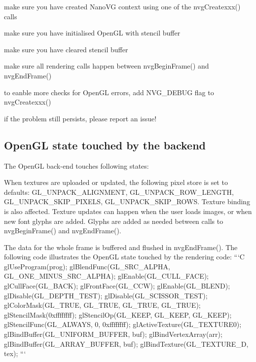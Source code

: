 \begin{DoxyItemize}
\item make sure you have created Nano\+V\+G context using one of the {\ttfamily nvg\+Createxxx()} calls
\item make sure you have initialised Open\+G\+L with stencil buffer
\item make sure you have cleared stencil buffer
\item make sure all rendering calls happen between {\ttfamily nvg\+Begin\+Frame()} and {\ttfamily nvg\+End\+Frame()}
\item to eanble more checks for Open\+G\+L errors, add {\ttfamily N\+V\+G\+\_\+\+D\+E\+B\+U\+G} flag to {\ttfamily nvg\+Createxxx()}
\item if the problem still persists, please report an issue!
\end{DoxyItemize}

\subsection*{Open\+G\+L state touched by the backend}

The Open\+G\+L back-\/end touches following states\+:

When textures are uploaded or updated, the following pixel store is set to defaults\+: {\ttfamily G\+L\+\_\+\+U\+N\+P\+A\+C\+K\+\_\+\+A\+L\+I\+G\+N\+M\+E\+N\+T}, {\ttfamily G\+L\+\_\+\+U\+N\+P\+A\+C\+K\+\_\+\+R\+O\+W\+\_\+\+L\+E\+N\+G\+T\+H}, {\ttfamily G\+L\+\_\+\+U\+N\+P\+A\+C\+K\+\_\+\+S\+K\+I\+P\+\_\+\+P\+I\+X\+E\+L\+S}, {\ttfamily G\+L\+\_\+\+U\+N\+P\+A\+C\+K\+\_\+\+S\+K\+I\+P\+\_\+\+R\+O\+W\+S}. Texture binding is also affected. Texture updates can happen when the user loads images, or when new font glyphs are added. Glyphs are added as needed between calls to {\ttfamily nvg\+Begin\+Frame()} and {\ttfamily nvg\+End\+Frame()}.

The data for the whole frame is buffered and flushed in {\ttfamily nvg\+End\+Frame()}. The following code illustrates the Open\+G\+L state touched by the rendering code\+: ```\+C gl\+Use\+Program(prog); gl\+Blend\+Func(\+G\+L\+\_\+\+S\+R\+C\+\_\+\+A\+L\+P\+H\+A, G\+L\+\_\+\+O\+N\+E\+\_\+\+M\+I\+N\+U\+S\+\_\+\+S\+R\+C\+\_\+\+A\+L\+P\+H\+A); gl\+Enable(\+G\+L\+\_\+\+C\+U\+L\+L\+\_\+\+F\+A\+C\+E); gl\+Cull\+Face(\+G\+L\+\_\+\+B\+A\+C\+K); gl\+Front\+Face(\+G\+L\+\_\+\+C\+C\+W); gl\+Enable(\+G\+L\+\_\+\+B\+L\+E\+N\+D); gl\+Disable(\+G\+L\+\_\+\+D\+E\+P\+T\+H\+\_\+\+T\+E\+S\+T); gl\+Disable(\+G\+L\+\_\+\+S\+C\+I\+S\+S\+O\+R\+\_\+\+T\+E\+S\+T); gl\+Color\+Mask(\+G\+L\+\_\+\+T\+R\+U\+E, G\+L\+\_\+\+T\+R\+U\+E, G\+L\+\_\+\+T\+R\+U\+E, G\+L\+\_\+\+T\+R\+U\+E); gl\+Stencil\+Mask(0xffffffff); gl\+Stencil\+Op(\+G\+L\+\_\+\+K\+E\+E\+P, G\+L\+\_\+\+K\+E\+E\+P, G\+L\+\_\+\+K\+E\+E\+P); gl\+Stencil\+Func(\+G\+L\+\_\+\+A\+L\+W\+A\+Y\+S, 0, 0xffffffff); gl\+Active\+Texture(\+G\+L\+\_\+\+T\+E\+X\+T\+U\+R\+E0); gl\+Bind\+Buffer(\+G\+L\+\_\+\+U\+N\+I\+F\+O\+R\+M\+\_\+\+B\+U\+F\+F\+E\+R, buf); gl\+Bind\+Vertex\+Array(arr); gl\+Bind\+Buffer(\+G\+L\+\_\+\+A\+R\+R\+A\+Y\+\_\+\+B\+U\+F\+F\+E\+R, buf); gl\+Bind\+Texture(\+G\+L\+\_\+\+T\+E\+X\+T\+U\+R\+E\+\_\+D, tex); ```


